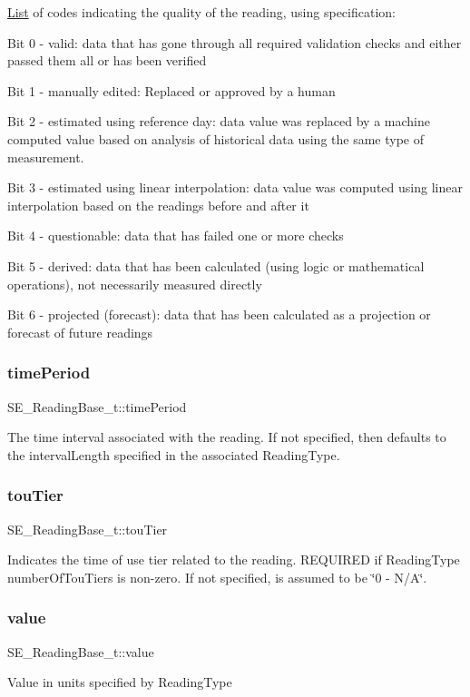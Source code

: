 \hyperlink{structList}{List} of codes indicating the quality of the reading, using specification\+:

Bit 0 -\/ valid\+: data that has gone through all required validation checks and either passed them all or has been verified

Bit 1 -\/ manually edited\+: Replaced or approved by a human

Bit 2 -\/ estimated using reference day\+: data value was replaced by a machine computed value based on analysis of historical data using the same type of measurement.

Bit 3 -\/ estimated using linear interpolation\+: data value was computed using linear interpolation based on the readings before and after it

Bit 4 -\/ questionable\+: data that has failed one or more checks

Bit 5 -\/ derived\+: data that has been calculated (using logic or mathematical operations), not necessarily measured directly

Bit 6 -\/ projected (forecast)\+: data that has been calculated as a projection or forecast of future readings \mbox{\label{group__ReadingBase_gae16dcf4680bc1bdc74ce0a8b3e90919f}} 
\subsubsection{\texorpdfstring{time\+Period}{timePeriod}}
{\footnotesize\ttfamily S\+E\+\_\+\+Reading\+Base\+\_\+t\+::time\+Period}

The time interval associated with the reading. If not specified, then defaults to the interval\+Length specified in the associated Reading\+Type. \mbox{\label{group__ReadingBase_ga610ccfbc828fc2c3c75d65739dab5991}} 
\subsubsection{\texorpdfstring{tou\+Tier}{touTier}}
{\footnotesize\ttfamily S\+E\+\_\+\+Reading\+Base\+\_\+t\+::tou\+Tier}

Indicates the time of use tier related to the reading. R\+E\+Q\+U\+I\+R\+ED if Reading\+Type number\+Of\+Tou\+Tiers is non-\/zero. If not specified, is assumed to be \char`\"{}0 -\/ N/\+A\char`\"{}. \mbox{\label{group__ReadingBase_ga5bf0963cd698da8a48200e661ca04fcc}} 
\subsubsection{\texorpdfstring{value}{value}}
{\footnotesize\ttfamily S\+E\+\_\+\+Reading\+Base\+\_\+t\+::value}

Value in units specified by Reading\+Type 